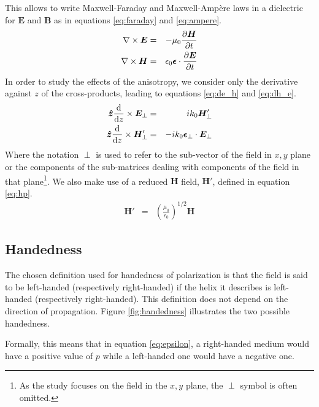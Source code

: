 This allows to write Maxwell-Faraday and Maxwell-Ampère laws in a dielectric for $\bm{E}$ and $\bm{B}$ as in equations \ref{eq:faraday} and \ref{eq:ampere}.
\begin{eqnarray}
\nabla \times\bm{E} &=& -\mu_0\pdv{\bm{H}}{t}\label{eq:faraday}\\
\nabla \times\bm{H} &=& \epsilon_0\bm{\epsilon}\cdot\pdv{\bm{E}}{t}\label{eq:ampere}
\end{eqnarray}
%
In order to study the effects of the anisotropy, we consider only the derivative against $z$ of the cross-products, leading to equations \ref{eq:de_h} and \ref{eq:dh_e}.
\begin{eqnarray}
\bm{\hat{z}}\dv{z}\times\bm{E}_\perp &=& ik_0\bm{H}'_\perp \label{eq:de_h}\\
\bm{\hat{z}}\dv{z}\times\bm{H}'_\perp &=& -ik_0\bm{\epsilon}_\perp\cdot\bm{E}_\perp \label{eq:dh_e}
\end{eqnarray}
%
Where the notation $\perp$ is used to refer to the sub-vector of the field in $x,y$ plane or the components of the sub-matrices dealing with components of the field in that plane\footnote{As the study focuses on the field in the $x,y$ plane, the $\perp$ symbol is often omitted.}. We also make use of a reduced $\bm{H}$ field, $\bm{H'}$, defined in equation \ref{eq:hp}. 
\begin{eqnarray}
\bm{H}' &=& \left(\frac{\mu_0}{\epsilon_0}\right)^{1/2}\bm{H} \label{eq:hp}
\end{eqnarray}

\subsection{Handedness}
\label{seq:handedness}
The chosen definition used for handedness of polarization is that the field is said to be left-handed (respectively right-handed) if the helix it describes is left-handed (respectively right-handed). This definition does not depend on the direction of propagation. Figure \ref{fig:handedness} illustrates the two possible handedness.

Formally, this means that in equation \ref{eq:epsilon}, a right-handed medium would have a positive value of $p$ while a left-handed one would have a negative one.

